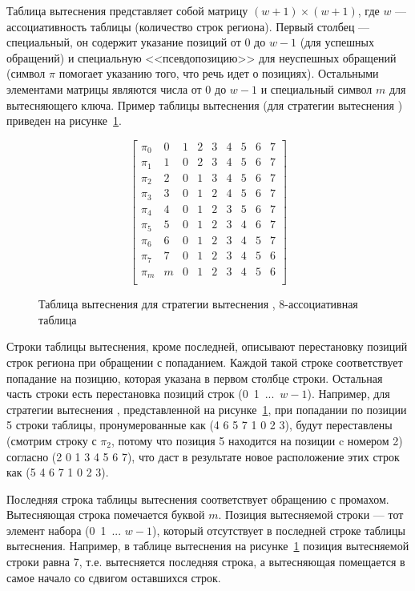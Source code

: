 \begin{enumerate}
Таблица вытеснения представляет собой матрицу $(w{+}1) \times (w{+}1)$, где $w$
--- ассоциативность таблицы (количество строк региона). Первый столбец ---
специальный, он содержит указание позиций от 0 до $w{-}1$ (для успешных обращений) и специальную <<псевдопозицию>> для неуспешных обращений (символ $\pi$ помогает
указанию того, что речь идет о позициях). Остальными элементами
матрицы являются числа от 0 до $w{-}1$ и специальный символ $m$ для
вытесняющего ключа. Пример таблицы вытеснения (для стратегии
вытеснения \LRU) приведен на рисунке~\ref{fig:PolicyTableLRU8}.

\begin{figure}[h]
$$ \left[
     \begin{array}{c|cccccccc}
       \pi_0 & 0 & 1 & 2 & 3 & 4 & 5 & 6 & 7 \\
       \pi_1 & 1 & 0 & 2 & 3 & 4 & 5 & 6 & 7 \\
       \pi_2 & 2 & 0 & 1 & 3 & 4 & 5 & 6 & 7 \\
       \pi_3 & 3 & 0 & 1 & 2 & 4 & 5 & 6 & 7 \\
       \pi_4 & 4 & 0 & 1 & 2 & 3 & 5 & 6 & 7 \\
       \pi_5 & 5 & 0 & 1 & 2 & 3 & 4 & 6 & 7 \\
       \pi_6 & 6 & 0 & 1 & 2 & 3 & 4 & 5 & 7 \\
       \pi_7 & 7 & 0 & 1 & 2 & 3 & 4 & 5 & 6 \\
       \pi_m & m & 0 & 1 & 2 & 3 & 4 & 5 & 6 \\
     \end{array}
   \right]
$$
\caption{Таблица вытеснения для стратегии вытеснения \LRU,
8-ассоциативная таблица}\label{fig:PolicyTableLRU8}
\end{figure}

Строки таблицы вытеснения, кроме последней, описывают перестановку позиций строк
региона при обращении с попаданием. Каждой такой строке соответствует попадание
на позицию, которая указана в первом столбце строки. Остальная часть строки есть
перестановка позиций строк (0~1~...~$w{-}1$). Например, для стратегии вытеснения
\LRU,
представленной на рисунке~\ref{fig:PolicyTableLRU8}, при попадании по позиции 5
строки таблицы, пронумерованные как (4 6 5 7 1 0 2 3), будут переставлены
(смотрим строку с $\pi_2$, потому что позиция 5 находится на позиции c номером
2) согласно (2 0 1 3 4 5 6 7), что даст в результате новое расположение этих
строк как (5 4 6 7 1 0 2 3).

Последняя строка таблицы вытеснения соответствует обращению с промахом.
Вытесняющая строка помечается буквой $m$. Позиция вытесняемой строки --- тот
элемент набора (0~1~... $w{-}1$), который отсутствует в последней строке таблицы
вытеснения. Например, в таблице вытеснения на рисунке~\ref{fig:PolicyTableLRU8}
позиция вытесняемой строки равна 7, т.е. вытесняется последняя строка, а
вытесняющая помещается в самое начало со сдвигом оставшихся строк.


\end{enumerate}
